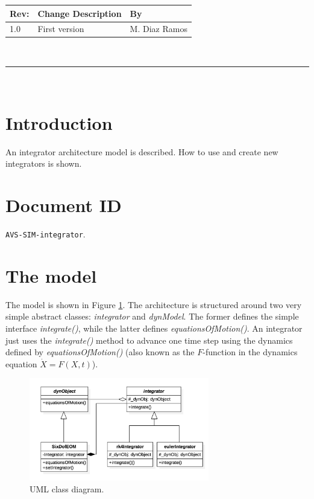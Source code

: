 \documentclass[]{AVSSimReportMemo}
\newcommand{\ModuleName}{integrator}
\begin{document}
\makeCover


%
%
\pagestyle{empty}
{\renewcommand{\arraystretch}{2}
\noindent
\begin{longtable}{|p{0.5in}|p{4.5in}|p{1.14in}|}
\hline
{\bfseries Rev}: & {\bfseries Change Description} & {\bfseries By} \\
\hline
1.0 & First version & M. Diaz Ramos \\
\hline

\end{longtable}
}

\newpage
\setcounter{page}{1}
\pagestyle{fancy}

\tableofcontents
~\\ \hrule ~\\

\section{Introduction}

An integrator architecture model is described. How to use and create new integrators is shown.

\section{Document ID}
{\tt AVS-SIM-\ModuleName}.  

\section{The model}

The model is shown in Figure \ref{fig:class}. The architecture is structured around two very simple abstract classes: \textit{integrator} and \textit{dynModel}. The former defines the simple interface \textit{integrate()}, while the latter defines \textit{equationsOfMotion()}. An integrator just uses the \textit{integrate()} method to advance one time step using the dynamics defined by \textit{equationsOfMotion()} (also known as the $F$-function in the dynamics equation $\dot X = F(X, t)$).

\begin{figure}
\centering
\includegraphics[width=0.7\textwidth]{Figures/class_diagram.png}
\caption{UML class diagram.}\label{fig:class}
\end{figure}
\end{document}
